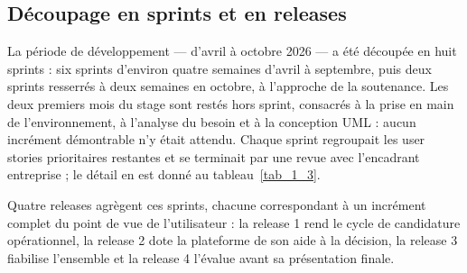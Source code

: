 \subsection{Découpage en sprints et en releases}
\label{sec_1_8_2}
La période de développement — d’avril à octobre 2026 — a été découpée en huit sprints : six sprints d’environ quatre semaines d’avril à septembre, puis deux sprints resserrés à deux semaines en octobre, à l’approche de la soutenance. Les deux premiers mois du stage sont restés hors sprint, consacrés à la prise en main de l’environnement, à l’analyse du besoin et à la conception UML : aucun incrément démontrable n’y était attendu. Chaque sprint regroupait les user stories prioritaires restantes et se terminait par une revue avec l’encadrant entreprise ; le détail en est donné au tableau~\ref{tab_1_3}.

Quatre releases agrègent ces sprints, chacune correspondant à un incrément complet du point de vue de l’utilisateur : la release 1 rend le cycle de candidature opérationnel, la release 2 dote la plateforme de son aide à la décision, la release 3 fiabilise l’ensemble et la release 4 l’évalue avant sa présentation finale.

